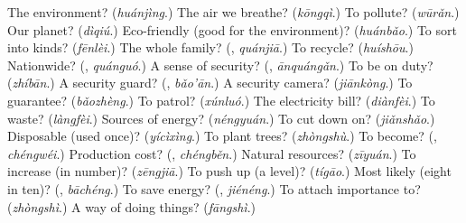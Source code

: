 \begin{tcolorbox}[breakable,colback=teal!4,colframe=teal!35!black,title={Before you move on}]
The environment? (\emph{huánjìng}.) The air we breathe? (\emph{kōngqì}.) To pollute? (\emph{wūrǎn}.) Our planet? (\emph{dìqiú}.) Eco-friendly (good for the environment)? (\emph{huánbǎo}.) To sort into kinds? (\emph{fēnlèi}.) The whole family? (\textbf{}, \emph{quánjiā}.) To recycle? (\emph{huíshōu}.) Nationwide? (\textbf{}, \emph{quánguó}.) A sense of security? (\textbf{}, \emph{ānquángǎn}.) To be on duty? (\emph{zhíbān}.) A security guard? (\textbf{}, \emph{bǎo'ān}.) A security camera? (\emph{jiānkòng}.) To guarantee? (\emph{bǎozhèng}.) To patrol? (\emph{xúnluó}.) The electricity bill? (\emph{diànfèi}.) To waste? (\emph{làngfèi}.) Sources of energy? (\emph{néngyuán}.) To cut down on? (\emph{jiǎnshǎo}.) Disposable (used once)? (\emph{yícìxìng}.) To plant trees? (\emph{zhòngshù}.) To become? (\textbf{}, \emph{chéngwéi}.) Production cost? (\textbf{}, \emph{chéngběn}.) Natural resources? (\emph{zīyuán}.) To increase (in number)? (\emph{zēngjiā}.) To push up (a level)? (\emph{tígāo}.) Most likely (eight in ten)? (\textbf{}, \emph{bāchéng}.) To save energy? (\textbf{}, \emph{jiénéng}.) To attach importance to? (\emph{zhòngshì}.) A way of doing things? (\emph{fāngshì}.)
\end{tcolorbox}
